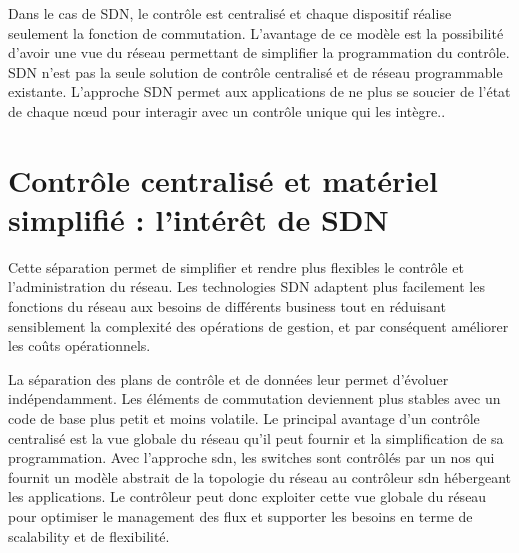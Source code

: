 Dans le cas de SDN, le contrôle est centralisé et chaque dispositif réalise seulement la fonction de commutation. L'avantage de ce modèle est la possibilité d'avoir une vue du réseau permettant de simplifier la programmation du contrôle. SDN n'est pas la seule solution de contrôle centralisé et de réseau programmable existante. L'approche SDN permet aux applications de ne plus se soucier de l'état de chaque nœud pour interagir avec un contrôle unique qui les intègre.. \cite{sdnbookControlDataPlanes}





\section{Contrôle centralisé et matériel simplifié : l'intérêt de SDN}



Cette séparation permet de simplifier et rendre plus flexibles le contrôle et l'administration du réseau. Les technologies SDN adaptent plus facilement les fonctions du réseau aux besoins de différents business tout en réduisant sensiblement la complexité des opérations de gestion, et par conséquent améliorer les coûts opérationnels. \cite{sndChineseBookConceptsApplications}


La séparation des plans de contrôle et de données leur permet d'évoluer indépendamment. Les éléments de commutation deviennent plus stables avec un code de base plus petit et moins volatile. 
Le principal avantage d'un contrôle centralisé est la vue globale du réseau qu'il peut fournir et la simplification de sa  programmation. Avec l'approche \gls{sdn}, les switches sont contrôlés par un \gls{nos} qui fournit un modèle abstrait de la topologie du réseau au contrôleur \gls{sdn} hébergeant les applications. Le contrôleur peut donc exploiter cette vue globale du réseau pour optimiser le management des flux et supporter les besoins en terme de \gls{scalability} et de flexibilité. \cite{WhySDN}

